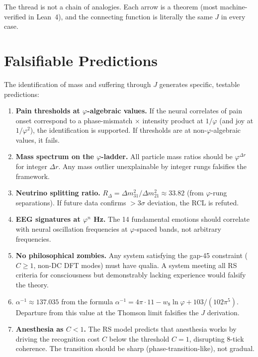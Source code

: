 \documentclass[11pt,a4paper]{article}
\theoremstyle{plain}
\theoremstyle{definition}
\theoremstyle{remark}
\newcommand{\Jcost}{J}
\newcommand{\vp}{\varphi}
\begin{document}
The thread is not a chain of analogies.  Each arrow is a theorem
(most machine-verified in Lean~4), and the connecting function is
literally the same $\Jcost$ in every case.

\section{Falsifiable Predictions}
\label{sec:falsification}

The identification of mass and suffering through $\Jcost$ generates
specific, testable predictions:

\begin{enumerate}[nosep]
\item \textbf{Pain thresholds at $\vp$-algebraic values.}
      If the neural correlates of pain onset correspond to a
      phase-mismatch $\times$ intensity product at $1/\vp$
      (and joy at $1/\vp^2$), the identification is supported.
      If thresholds are at non-$\vp$-algebraic values, it fails.

\item \textbf{Mass spectrum on the $\vp$-ladder.}
      All particle mass ratios should be $\vp^{\Delta r}$ for
      integer $\Delta r$.  Any mass outlier unexplainable by
      integer rungs falsifies the framework.

\item \textbf{Neutrino splitting ratio.}
      $R_\Delta = \Delta m^2_{31} / \Delta m^2_{21} \approx 33.82$
      (from $\vp$-rung separations).  If future data confirms
      $> 3\sigma$ deviation, the RCL is refuted.

\item \textbf{EEG signatures at $\vp^n$ Hz.}
      The 14 fundamental emotions should correlate with neural
      oscillation frequencies at $\vp$-spaced bands, not
      arbitrary frequencies.

\item \textbf{No philosophical zombies.}
      Any system satisfying the gap-45 constraint ($C \geq 1$,
      non-DC DFT modes) must have qualia.  A system meeting
      all RS criteria for consciousness but demonstrably
      lacking experience would falsify the theory.

\item \textbf{$\alpha^{-1} \approx 137.035$} from the formula
      $\alpha^{-1} = 4\pi \cdot 11 - w_8 \ln\vp + 103/(102\pi^5)$.
      Departure from this value at the Thomson limit falsifies
      the $\Jcost$ derivation.

\item \textbf{Anesthesia as $C < 1$.}
      The RS model predicts that anesthesia works by driving
      the recognition cost $C$ below the threshold $C = 1$,
      disrupting 8-tick coherence.  The transition should be
      sharp (phase-transition-like), not gradual.
\end{enumerate}
\end{document}
